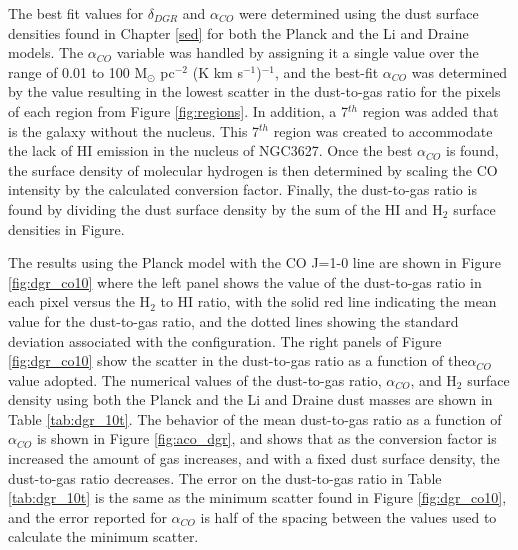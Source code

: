 The best fit values for $\delta_{DGR}$ and $\alpha_{CO}$ were determined using the dust surface densities found in Chapter \ref{sed} for both the Planck and the Li and Draine models.  The $\alpha_{CO}$ variable was handled by assigning it a single value over the range of 0.01 to 100 M$_\odot$ pc$^{-2}$ (K km s$^{-1}$)$^{-1}$, and the best-fit $\alpha_{CO}$ was determined by the value resulting in the lowest scatter in the dust-to-gas ratio for the pixels of each region from Figure \ref{fig:regions}.  In addition, a 7$^{th}$ region was added that is the galaxy without the nucleus.  This 7$^{th}$ region was created to accommodate the lack of HI emission in the nucleus of NGC3627.  Once the best $\alpha_{CO}$ is found, the surface density of molecular hydrogen is then determined by scaling the CO intensity by the calculated conversion factor.   Finally, the dust-to-gas ratio is found by dividing the dust surface density by the sum of the HI and H$_2$ surface densities in Figure.  

The results using the Planck model with the CO J=1-0 line are shown in Figure \ref{fig:dgr_co10} where the left panel shows the value of the dust-to-gas ratio in each pixel versus the H$_2$ to HI ratio, with the solid red line indicating the mean value for the dust-to-gas ratio, and the dotted lines showing the standard deviation associated with the configuration.  The right panels of Figure \ref{fig:dgr_co10} show the scatter in the dust-to-gas ratio as a function of the$\alpha_{CO}$ value adopted.  The numerical values of the dust-to-gas ratio, $\alpha_{CO}$, and H$_2$ surface density using both the Planck and the Li and Draine dust masses are shown in Table \ref{tab:dgr_10t}.  The behavior of the mean dust-to-gas ratio as a function of $\alpha_{CO}$ is shown in Figure \ref{fig:aco_dgr}, and shows that as the conversion factor is increased the amount of gas increases, and with a fixed dust surface density, the dust-to-gas ratio decreases.  The error on the dust-to-gas ratio in Table \ref{tab:dgr_10t} is the same as the minimum scatter found in Figure \ref{fig:dgr_co10}, and the error reported for $\alpha_{CO}$ is half of the spacing between the values used to calculate the minimum scatter.

